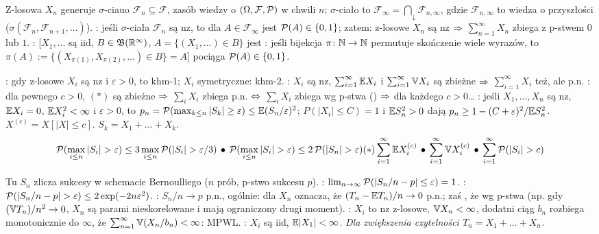 Z-losowa $X_n$ generuje  $\sigma$-ciauo $\mathcal F_n \subseteq \mathcal F$, zasób wiedzy o $(\Omega, \mathcal F, \operatorname{\mathcal{P}} )$ w chwili $n$; $\sigma$-ciało  to $\mathcal F_\infty = \bigcap_{\downarrow} \mathcal F_{n, \infty}$, gdzie $\mathcal F_{n, \infty}$ to wiedza o przyszłości ($\sigma(\mathcal F_n, \mathcal F_{n+1}, \dots)$).
: jeśli $\sigma$-ciała $\mathcal F_n$ są nz, to dla $A \in \mathcal F_{\infty}$ jest $\operatorname{\mathcal{P}} (A) \in \{0,1\}$; zatem: z-losowe $X_n$ są nz $\Rightarrow$ $\sum_{n=1}^\infty X_n$ zbiega z p-stwem $0$ lub $1$.
: [$X_1, \ldots$ są iid, $B \in \mathfrak B(\mathbb{R}^\infty)$, $A = \{(X_1, \ldots) \in B\}$ jest : jeśli bijekcja $\pi \colon \mathbb N \to \mathbb N$ permutuje skończenie wiele wyrazów, to $\pi(A) := \{(X_{\pi(1)}, X_{\pi(2)}, \ldots) \in B\} = A$] pociąga $\operatorname{\mathcal{P}} (A) \in \{0, 1\}$.

:  gdy z-losowe $X_i$ są nz i $\varepsilon > 0$, to khm-1; $X_i$ symetryczne: khm-2.
: $X_i$ są nz, $\sum_{i=1}^\infty \mathbb{E} X_i$ i $\sum_{i=1}^\infty \mathbb{V} X_i$ są zbieżne $\Rightarrow$ $\sum_{i=1}^\infty X_i$ też, ale p.n.
: dla pewnego $c > 0$, $(*)$ są zbieżne $\Rightarrow$ $\sum_i X_i$ zbiega p.n. $\Leftrightarrow$ $\sum_i X_i$ zbiega wg p-stwa () $\Rightarrow$ dla każdego $c > 0$\ldots{} 
: jeśli $X_1, \dots, X_n$ są nz, $\mathbb{E} X_i = 0$, $\mathbb{E} X_i^2 < \infty$ i $\varepsilon > 0$, to $p_n = \operatorname{\mathcal{P}} (\max_{k \le n} |S_k| \ge \varepsilon) \le \mathbb{E} (S_n/\varepsilon)^2$; $P(|X_i| \le C) = 1$ i $\mathbb{E} S_n^2 > 0$ dają $p_n \ge 1 - (C + \varepsilon)^2 / \mathbb{E} S_n^2$.
\hfill $X^{(c)} = X [|X| \le c]$. $S_k = X_1 + \dots + X_k$.
\[
	\pstwo (\max_{i \le n} |S_i| > \varepsilon) \le 3 \max_{i \le n} \pstwo (|S_i| > \varepsilon/3) \spk
	\pstwo (\max_{i \le n} |S_i| > \varepsilon) \le 2 \pstwo (|S_n| > \varepsilon)
	\hfill (*)
	\sum_{i=1}^\infty \expected X_i^{(c)} \spk
	\sum_{i=1}^\infty \variance X_i^{(c)} \spk
	\sum_{i=1}^\infty \pstwo (|S_i|> c)
\]

Tu $S_n$  zlicza sukcesy w schemacie Bernoulliego ($n$ prób, p-stwo sukcesu $p$).
: $\lim_{n \to \infty} \operatorname{\mathcal{P}} (|S_n/n - p| \le \varepsilon) = 1$. 
: $\operatorname{\mathcal{P}} (|S_n/n - p| > \varepsilon) \le 2 \exp (-2n \varepsilon^2)$. 
: $S_n/n \to p$ p.n., ogólnie:  dla $X_n$ oznacza, że $(T_n - \mathbb{E} T_n)/n \to 0$ p.n.; zaś , że wg p-stwa (np. gdy $(\mathbb{V} T_n)/n^2 \to 0$, $X_n$ są parami nieskorelowane i mają ograniczony drugi moment).
: $X_i$ to nz z-losowe, $\mathbb{V} X_n < \infty$, dodatni ciąg $b_n$ rozbiega monotonicznie do $\infty$, że $\sum_{n=1}^\infty \mathbb{V} (X_n/b_n) < \infty$: MPWL.
: $X_i$ są iid, $\mathbb{E} |X_1| <\infty$.
\emph{Dla zwiększenia czytelności $T_n = X_1 + \dots + X_n$.}

